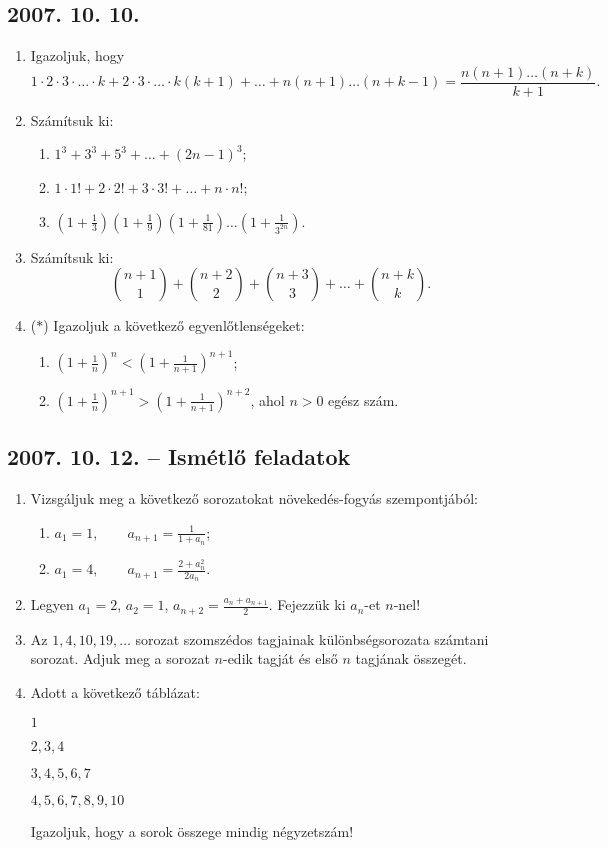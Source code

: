 \documentclass{article}
\newenvironment{abc}{\begin{enumerate}[label=\textit{\alph*})]}{\end{enumerate}}
\begin{document}
\subsection*{2007. 10. 10.}
\begin{enumerate}
\item Igazoljuk, hogy 
$$1\cdot 2\cdot 3\cdot\ldots\cdot k+
2\cdot 3\cdot\ldots\cdot k(k+1)+\ldots+
n(n+1)\ldots(n+k-1)=\frac{n(n+1)\ldots(n+k)}{k+1}.$$ 
\item Számítsuk ki:
\begin{abc}
\item $\displaystyle{1^3+3^3+5^3+\ldots+(2n-1)^3}$;
\item $\displaystyle{1\cdot 1!+2\cdot 2!+3\cdot 3!+\ldots+n\cdot n!}$; 
\item $\displaystyle{\left(1+\frac{1}{3}\right)
\left(1+\frac{1}{9}\right)\left(1+\frac{1}{81}\right)\ldots\left(1+\frac{1}{3^{2n}}\right)
}$.
\end{abc}
\item Számítsuk ki:
$$\binom{n+1}{1}+\binom{n+2}{2}+\binom{n+3}{3}+\ldots+\binom{n+k}{k}.$$
\item ($*$) Igazoljuk a következő egyenlőtlenségeket:
\begin{abc}
\item $\displaystyle{\left(1+\frac{1}{n}\right)^n < 
\left(1+\frac{1}{n+1}\right)^{n+1}}$; 
\item $\displaystyle{
\left(1+\frac{1}{n}\right)^{n+1} > 
\left(1+\frac{1}{n+1}\right)^{n+2}
}$, ahol $n>0$ egész szám.
\end{abc}
\end{enumerate}

\subsection*{2007. 10. 12. -- Ismétlő feladatok}
\begin{enumerate}
\item Vizsgáljuk meg a következő sorozatokat növekedés-fogyás szempontjából:
\begin{abc}
\item $\displaystyle{a_1=1,\qquad a_{n+1}=\frac{1}{1+a_n}}$;
\item $\displaystyle{a_1=4,\qquad a_{n+1}=\frac{2+a_n^2}{2a_n}}$.
\end{abc}
\item Legyen $a_1=2$, $a_2=1$, $a_{n+2}=\frac{a_n+a_{n+1}}{2}$. Fejezzük ki $a_n$-et $n$-nel!
\item Az $1, 4, 10, 19,\ldots$ sorozat szomszédos tagjainak különbségsorozata számtani sorozat. Adjuk meg a sorozat $n$-edik tagját és első $n$ tagjának összegét.
\item Adott a következő táblázat:

$1$

$2, 3, 4$

$3, 4, 5, 6, 7$

$4, 5, 6, 7, 8, 9, 10$

\noindent Igazoljuk, hogy a sorok összege mindig négyzetszám!
\end{enumerate}
\end{document}
